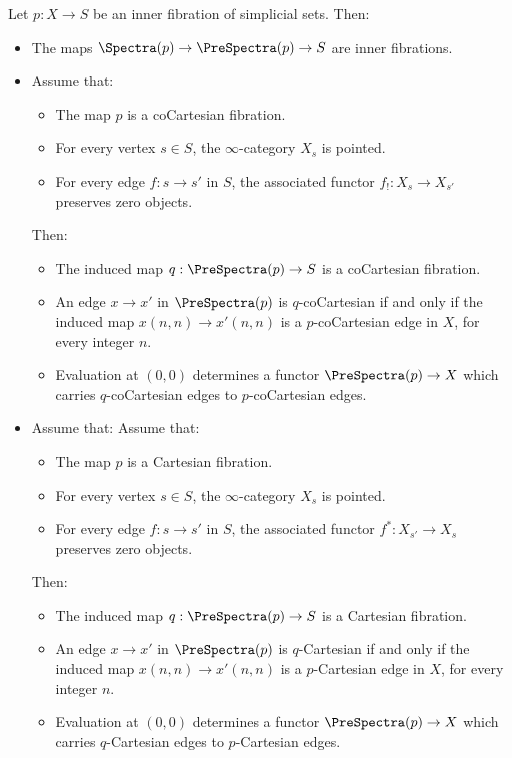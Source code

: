 \begin{proposition}\label{swingg}
Let $p: X \rightarrow S$ be an inner fibration of simplicial sets. Then:
\begin{itemize}
\item[$(1)$] The maps $\Spectra(p) \rightarrow \PreSpectra(p) \rightarrow S$
are inner fibrations.

\item[$(2)$] Assume that:
\begin{itemize}
\item[$(a)$] The map $p$ is a coCartesian fibration.
\item[$(b)$] For every vertex $s \in S$, the $\infty$-category $X_{s}$ is pointed.
\item[$(c)$] For every edge $f: s \rightarrow s'$ in $S$, the associated functor
$f_{!}: X_{s} \rightarrow X_{s'}$ preserves zero objects.
\end{itemize}
Then:
\begin{itemize}
\item[$(i)$] The induced map $q: \PreSpectra(p) \rightarrow S$ is a coCartesian fibration.
\item[$(ii)$] An edge $x \rightarrow x'$ in $\PreSpectra(p)$ is $q$-coCartesian if and only
if the induced map $x(n,n) \rightarrow x'(n,n)$ is a $p$-coCartesian edge in $X$, for every
integer $n$.
\item[$(iii)$] Evaluation at $(0,0)$ determines a functor $\PreSpectra(p) \rightarrow X$
which carries $q$-coCartesian edges to $p$-coCartesian edges.
\end{itemize}

\item[$(2')$] Assume that:
Assume that:
\begin{itemize}
\item[$(a)$] The map $p$ is a Cartesian fibration.
\item[$(b)$] For every vertex $s \in S$, the $\infty$-category $X_{s}$ is pointed.
\item[$(c)$] For every edge $f: s \rightarrow s'$ in $S$, the associated functor
$f^{\ast}: X_{s'} \rightarrow X_{s}$ preserves zero objects.
\end{itemize}
Then:
\begin{itemize}
\item[$(i)$] The induced map $q: \PreSpectra(p) \rightarrow S$ is a Cartesian fibration.
\item[$(ii)$] An edge $x \rightarrow x'$ in $\PreSpectra(p)$ is $q$-Cartesian if and only
if the induced map $x(n,n) \rightarrow x'(n,n)$ is a $p$-Cartesian edge in $X$, for every
integer $n$.
\item[$(iii)$] Evaluation at $(0,0)$ determines a functor $\PreSpectra(p) \rightarrow X$
which carries $q$-Cartesian edges to $p$-Cartesian edges.
\end{itemize}


\end{itemize}
\end{proposition}
